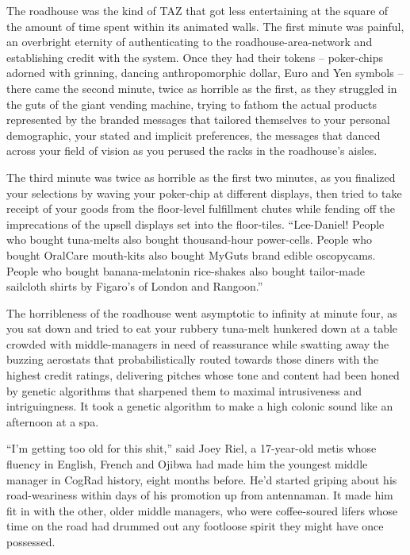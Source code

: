 \tb

The roadhouse was the kind of TAZ that got less entertaining at the 
square of the amount of time spent within its animated walls. The first 
minute was painful, an overbright eternity of authenticating to the 
roadhouse-area-network and establishing credit with the system. Once 
they had their tokens -- poker-chips adorned with grinning, dancing 
anthropomorphic dollar, Euro and Yen symbols -- there came the second 
minute, twice as horrible as the first, as they struggled in the guts 
of the giant vending machine, trying to fathom the actual products 
represented by the branded messages that tailored themselves to your 
personal demographic, your stated and implicit preferences, the 
messages that danced across your field of vision as you perused the 
racks in the roadhouse's aisles.

The third minute was twice as horrible as the first two minutes, as you 
finalized your selections by waving your poker-chip at different 
displays, then tried to take receipt of your goods from the floor-level 
fulfillment chutes while fending off the imprecations of the upsell 
displays set into the floor-tiles. “Lee-Daniel! People who bought 
tuna-melts also bought thousand-hour power-cells. People who bought 
OralCare mouth-kits also bought MyGuts brand edible oscopycams. People 
who bought banana-melatonin rice-shakes also bought tailor-made 
sailcloth shirts by Figaro's of London and Rangoon.”

The horribleness of the roadhouse went asymptotic to infinity at minute 
four, as you sat down and tried to eat your rubbery tuna-melt hunkered 
down at a table crowded with middle-managers in need of reassurance 
while swatting away the buzzing aerostats that probabilistically routed 
towards those diners with the highest credit ratings, delivering 
pitches whose tone and content had been honed by genetic algorithms 
that sharpened them to maximal intrusiveness and intriguingness. It 
took a genetic algorithm to make a high colonic sound like an afternoon 
at a spa.

“I'm getting too old for this shit,” said Joey Riel, a 17-year-old 
metis whose fluency in English, French and Ojibwa had made him the 
youngest middle manager in CogRad history, eight months before. He'd 
started griping about his road-weariness within days of his promotion 
up from antennaman. It made him fit in with the other, older middle 
managers, who were coffee-soured lifers whose time on the road had 
drummed out any footloose spirit they might have once possessed.

